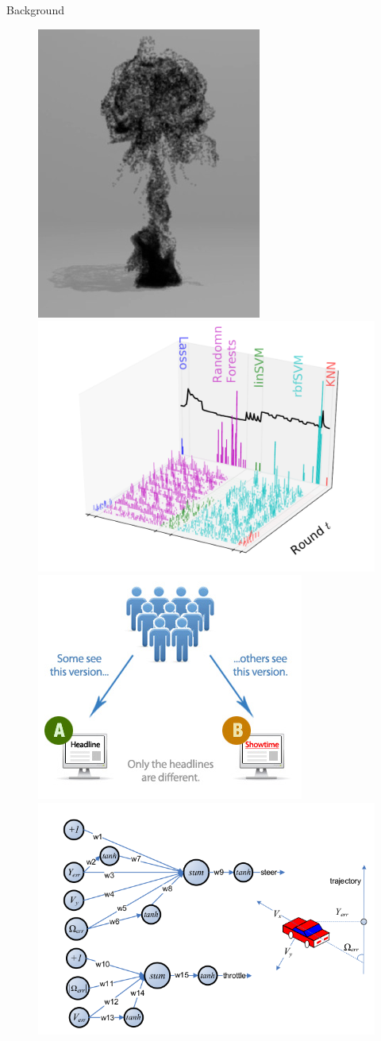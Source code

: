 \documentclass[final]{beamer}
\begin{document}
\begin{frame}[t]
\begin{columns}[T]
\begin{column}{.48\textwidth}
\begin{block}{Background}
\begin{minipage}[r]{0.35\columnwidth}
\begin{figure}[t]
      \includegraphics[width=0.45\columnwidth]{../Presentation//figs/animation}  
      \includegraphics[width=0.55\columnwidth]{../Presentation//figs/wine_arms_EI_T40} \\
      \includegraphics[width=0.45\columnwidth]{../Presentation//figs/abtest}
      \includegraphics[width=0.55\columnwidth]{../Presentation//figs/control}
     \end{figure}
    \end{minipage}
  

\end{block}
\end{column}
\end{columns}
\end{frame}
\end{document}
